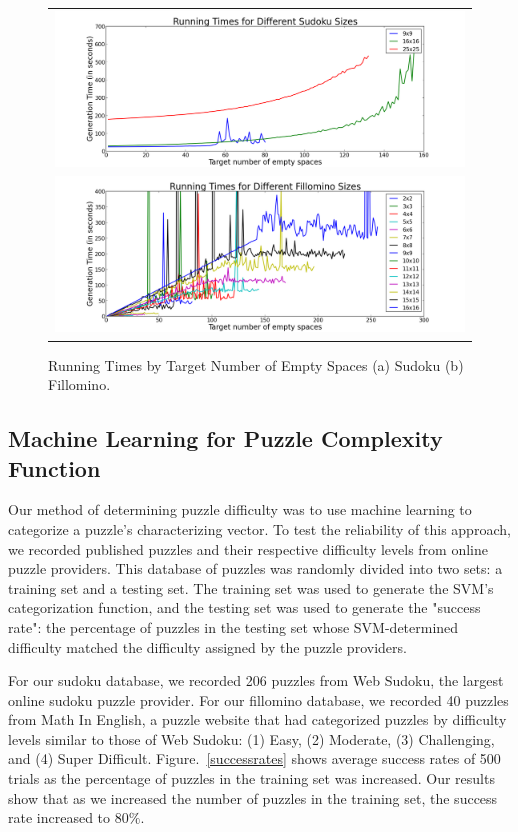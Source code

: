 \begin{figure}[!htpb]
\centering
\begin{tabular}{c}
 \includegraphics[scale=0.4]{experimentgraphs/SudokuRunTime3.png}
\\
\includegraphics[scale=0.4]{experimentgraphs/fillominoRunTime3.png}
\end{tabular}
\caption{Running Times by Target Number of Empty Spaces (a) Sudoku (b) Fillomino.}
\label{runtimes}
\end{figure}

\subsection{Machine Learning for Puzzle Complexity Function}

Our method of determining puzzle difficulty was to use machine learning to categorize a puzzle's characterizing vector. To test the reliability of this approach, we recorded published puzzles and their respective difficulty levels from online puzzle providers. This database of puzzles was randomly divided into two sets: a training set and a testing set. The training set was used to generate the SVM's categorization function, and the testing set was used to generate the "success rate": the percentage of puzzles in the testing set whose SVM-determined difficulty matched the difficulty assigned by the puzzle providers. 

For our sudoku database, we recorded 206 puzzles from Web Sudoku, the largest online sudoku puzzle provider. For our fillomino database, we recorded 40 puzzles from Math In English, a puzzle website that had categorized puzzles by difficulty levels similar to those of Web Sudoku: (1) Easy, (2) Moderate, (3) Challenging, and (4) Super Difficult. Figure.~\ref{successrates} shows average success rates of 500 trials as the percentage of puzzles in the training set was increased. Our results show that as we increased the number of puzzles in the training set, the success rate increased to $80 \%$.

